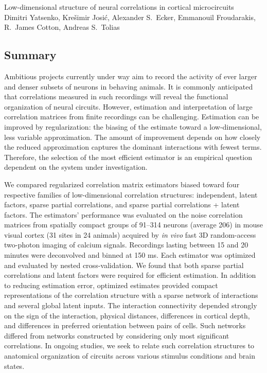 \documentclass[12pt]{amsart}
\begin{document}
\begin{flushleft}
{\Large
Low-dimensional structure of neural correlations in cortical microcircuits
}
\\
\vspace{6pt}
Dimitri Yatsenko, 
Kre\v{s}imir Josi\'{c},
Alexander S.~Ecker,
Emmanouil Froudarakis,
R.~James Cotton,
Andreas S.~Tolias
\end{flushleft}
\subsection*{Summary}
Ambitious projects currently under way aim to record the activity of ever larger and denser subsets of neurons in behaving animals. It is commonly anticipated that correlations measured in such recordings will reveal the functional organization of neural circuits. However, estimation and interpretation of  large correlation matrices from finite recordings can be challenging.  Estimation can be improved by regularization: the biasing of the estimate toward a low-dimensional, less variable approximation.  The amount of improvement depends on how closely the reduced approximation captures the dominant interactions with fewest terms. Therefore, the selection of the most efficient estimator is an empirical question dependent on the system under investigation. 

We compared regularized correlation matrix estimators biased toward four respective families of low-dimensional correlation structures: independent, latent factors, sparse partial correlations, and sparse partial correlations + latent factors.  The estimators' performance was evaluated on the noise correlation matrices from spatially compact groups of 91--314 neurons (average 206) in mouse visual cortex (31 sites in 24 animals) acquired by \emph{in vivo} fast 3D random-access two-photon imaging of calcium signals. Recordings lasting between 15 and 20 minutes were deconvolved and binned at 150 ms. Each estimator was optimized and evaluated by nested cross-validation.  We found that both sparse partial correlations and latent factors were required for efficient estimation.  In addition to reducing estimation error, optimized estimates provided compact representations of the correlation structure with a sparse network of interactions and several global latent inputs. The interaction connectivity depended strongly on the sign of the interaction, physical distances, differences in cortical depth, and differences in preferred orientation between pairs of cells. Such networks differed from networks constructed by considering only most significant correlations. In ongoing studies, we seek to relate such correlation structures to anatomical organization of circuits across various stimulus conditions and brain states.
\end{document}
